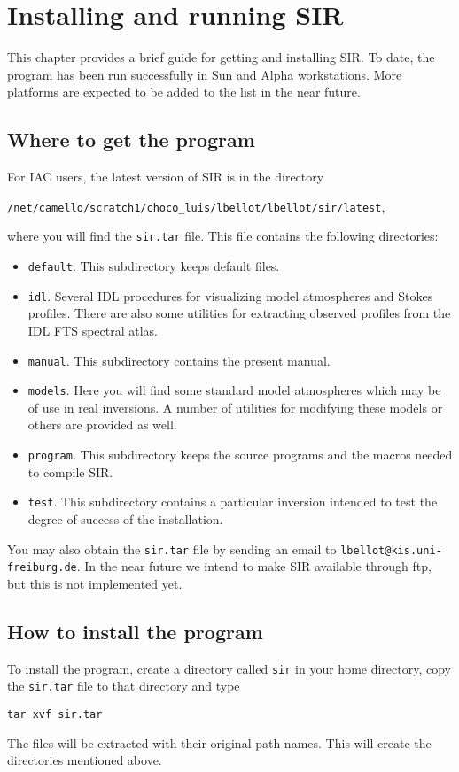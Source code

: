 \chapter{Installing and running SIR}
This chapter provides a brief guide for getting and installing SIR. To
date, the program has been run successfully in Sun and Alpha
workstations. More platforms are expected to be added to the list in
the near future. 

\section{Where to get the program}
For IAC users, the latest version of SIR is in the directory
\begin{center}
{\tt /net/camello/scratch1/choco\_luis/lbellot/lbellot/sir/latest},
\end{center}
where you will find the {\tt sir.tar} file. This file contains the following 
directories: 
\begin{itemize}
\item {\tt default}. This subdirectory keeps default files. 
\item {\tt idl}. Several IDL procedures for visualizing model atmospheres
and Stokes profiles. There are also some utilities for extracting observed
profiles from the IDL FTS spectral atlas.
\item {\tt manual}. This subdirectory contains the present manual.
\item {\tt models}. Here you will find some standard model atmospheres
which may be of use in real inversions. A number of utilities for modifying
these models or others are provided as well.
\item {\tt program}. This subdirectory keeps the source programs and the
macros needed to compile SIR.
\item {\tt test}. This subdirectory contains a particular inversion intended
to test the degree of success of the installation. 
\end{itemize}

You may also obtain the {\tt sir.tar} file by sending an email to
{\tt lbellot@kis.uni-freiburg.de}. In the near future we intend to make SIR available
through ftp, but this is not implemented yet.

\section{How to install the program}
To install the program, create a directory called {\tt sir} in your home
directory, copy the {\tt sir.tar} file to that directory and type
\begin{flushleft}
{\tt tar xvf sir.tar}
\end{flushleft}
The files will be extracted with their original path names. This will
create the directories mentioned above.

